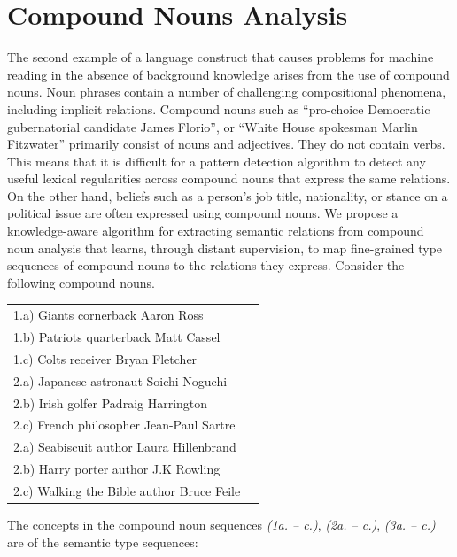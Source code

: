 \clearpage
\section{Compound  Nouns Analysis} \label{nominals}
The second example of a language construct that causes problems for machine reading in the absence of background knowledge 
arises from the use of compound nouns. Noun phrases contain a number of challenging compositional
phenomena, including implicit relations.
  Compound nouns such as ``pro-choice Democratic gubernatorial candidate
James Florio'', or ``White House spokesman Marlin Fitzwater'' primarily consist of  nouns and adjectives. They do not contain verbs. 
This means that it is difficult for a pattern detection algorithm to detect any useful lexical regularities across compound nouns that express the same relations.   On the other hand, beliefs such as a person’s job title, nationality, or stance on a political issue
are often expressed using compound nouns. We  propose a knowledge-aware algorithm for extracting semantic relations from compound noun analysis that learns, through distant supervision, to  map fine-grained type sequences of compound nouns to the relations they express.
Consider the following compound nouns. 



\begin{table}[h]
%
\centering
%
\begin{tabular}{ll}
\hline
1.a) Giants	cornerback	Aaron Ross \\
1.b) Patriots	quarterback	 Matt Cassel \\
1.c) Colts	receiver	Bryan Fletcher \\
\hline
2.a)  Japanese	astronaut	Soichi Noguchi \\
2.b) Irish	golfer	Padraig Harrington \\
2.c) French	philosopher	Jean-Paul Sartre \\
\hline
2.a) Seabiscuit	author	Laura Hillenbrand \\
2.b) Harry porter author J.K Rowling \\
2.c) Walking the Bible author Bruce Feile \\
\end{tabular}
\label{tab:nominalsexamples}
\end{table}
     

The concepts in the  compound noun sequences \textit{(1a. -- c.)}, \textit{(2a. -- c.)}, \textit{(3a. -- c.)}  are
of the semantic type sequences:

